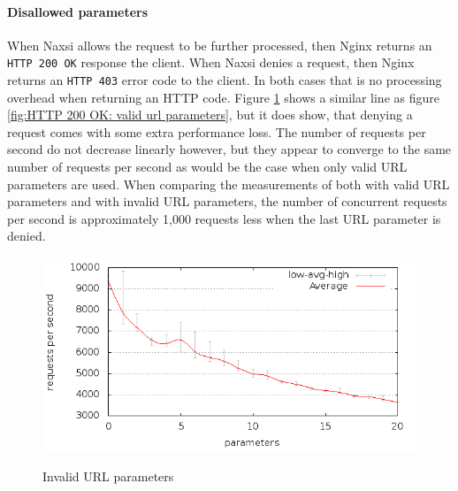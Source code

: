 \documentclass[Measurements]{subfiles}
\begin{document}
\paragraph{Disallowed parameters}
When Naxsi allows the request to be further processed, then Nginx returns an \verb+HTTP 200 OK+ response the client. When Naxsi denies a request, then Nginx returns an \verb+HTTP 403+ error code to the client. In both cases that is no processing overhead when returning an HTTP code. Figure \ref{fig:HTTP 200 OK: invalid url parameters} shows a similar line as figure \ref{fig:HTTP 200 OK: valid url parameters}, but it does show, that denying a request comes with some extra performance loss. The number of requests per second do not decrease linearly however, but they appear to converge to the same number of requests per second as would be the case when only valid \ac{URL} parameters are used. When comparing the measurements of both with valid \ac{URL} parameters and with invalid \ac{URL} parameters, the number of concurrent requests per second is approximately 1,000 requests less when the last \ac{URL} parameter is denied.

\begin{figure}[H]
\caption{Invalid URL parameters}
\centering
\includegraphics[scale=0.55] {images/results/200_with_naxsi_incremented_disallowed_parameters/output.png}
\label{fig:HTTP 200 OK: invalid url parameters}
\end{figure}
\end{document}
